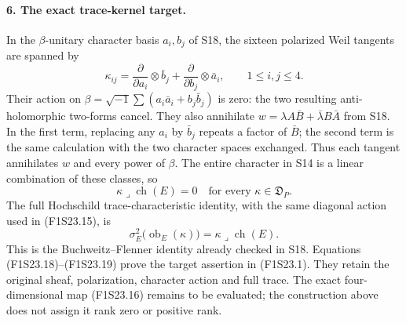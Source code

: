 \paragraph{6. The exact trace-kernel target.}
In the $\beta$-unitary character basis $a_i,b_j$ of S18,
the sixteen polarized Weil tangents are spanned by
\[
   \kappa_{ij}=\frac\partial{\partial a_i}\otimes\bar b_j
              +\frac\partial{\partial b_j}\otimes\bar a_i,
                         \qquad1\le i,j\le4.
 \tag{F1S23.17}
\]
Their action on $\beta=\sqrt{-1}\sum(a_i\bar a_i+b_j\bar b_j)$
is zero: the two resulting anti-holomorphic two-forms cancel.
They also annihilate
$w=\lambda A\bar B+\bar\lambda B\bar A$ from S18.
In the first term, replacing any $a_i$ by $\bar b_j$ repeats
a factor of $\bar B$; the second term is the same calculation
with the two character spaces exchanged. Thus each tangent
annihilates $w$ and every power of $\beta$.
The entire character in S14 is a linear combination of these
classes, so
\[
                \kappa\mathbin{\lrcorner}\operatorname{ch}(E)=0
                        \quad\text{for every }\kappa\in\mathfrak D_P.
 \tag{F1S23.18}
\]
The full Hochschild trace-characteristic identity, with the
same diagonal action used in (F1S23.15), is
\[
 \sigma_E^2\bigl(\operatorname{ob}_E(\kappa)\bigr)
                    =\kappa\mathbin{\lrcorner}\operatorname{ch}(E).
 \tag{F1S23.19}
\]
This is the Buchweitz--Flenner identity already checked in S18.
Equations (F1S23.18)--(F1S23.19) prove the target assertion in
(F1S23.1). They retain the original sheaf, polarization,
character action and full trace. The exact four-dimensional
map (F1S23.16) remains to be evaluated; the construction above
does not assign it rank zero or positive rank.

